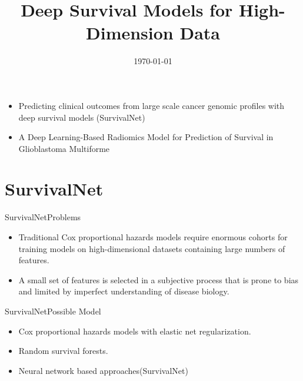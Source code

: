\documentclass[
]{beamer}
\begin{document}
	
	\title[]{Deep Survival Models for High-Dimension Data}
	\date{\today}
	\subject{Presentation Subject}
	
	\begin{frame}[plain]
		\maketitle
	\end{frame}
	
	
	\begin{frame}[plain]
		\begin{itemize}
			\item Predicting clinical outcomes from
			large scale cancer genomic profiles
			with deep survival models (SurvivalNet)
			\item A Deep Learning-Based Radiomics
			Model for Prediction of Survival in
			Glioblastoma Multiforme
		\end{itemize}
		
	\end{frame}
	
	\section{SurvivalNet}
	\begin{frame}[plain]{SurvivalNet}{Problems}
		\begin{itemize}
			\item Traditional Cox proportional hazards models require enormous cohorts for training models on
			high-dimensional datasets containing large numbers of features. 
			\item  A small set of features is
			selected in a subjective process that is prone to bias and limited by imperfect understanding of disease biology.
		\end{itemize}
	\end{frame}
	
	\begin{frame}[plain]{SurvivalNet}{Possible Model}
		\begin{itemize}
			\item  Cox proportional hazards models with  elastic net regularization.
			\item  Random survival forests.
			\item  Neural network based approaches(SurvivalNet)
		\end{itemize}
	\end{frame}
	
\end{document}
